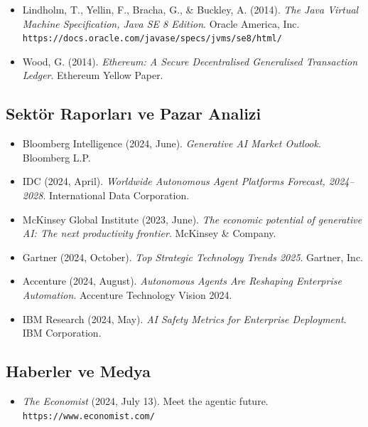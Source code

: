 \documentclass[11pt]{article}
\begin{document}
\begin{itemize}[noitemsep]
\begin{itemize}[noitemsep]
\begin{itemize}[noitemsep]
\begin{itemize}[noitemsep]
\begin{itemize}[noitemsep]
\begin{itemize}[noitemsep]
\begin{itemize}[noitemsep]
\begin{enumerate}[noitemsep]
\begin{itemize}[noitemsep]
\begin{itemize}[leftmargin=*, label={}]
  \item Lindholm, T., Yellin, F., Bracha, G., \& Buckley, A. (2014). \textit{The Java Virtual Machine Specification, Java SE 8 Edition}. Oracle America, Inc. \texttt{https://docs.oracle.com/javase/specs/jvms/se8/html/}

  \item Wood, G. (2014). \textit{Ethereum: A Secure Decentralised Generalised Transaction Ledger}. Ethereum Yellow Paper.
\end{itemize}

\subsection*{Sektör Raporları ve Pazar Analizi}

\begin{itemize}[leftmargin=*, label={}]
  \item Bloomberg Intelligence (2024, June). \textit{Generative AI Market Outlook}. Bloomberg L.P.

  \item IDC (2024, April). \textit{Worldwide Autonomous Agent Platforms Forecast, 2024--2028}. International Data Corporation.

  \item McKinsey Global Institute (2023, June). \textit{The economic potential of generative AI: The next productivity frontier}. McKinsey \& Company.

  \item Gartner (2024, October). \textit{Top Strategic Technology Trends 2025}. Gartner, Inc.

  \item Accenture (2024, August). \textit{Autonomous Agents Are Reshaping Enterprise Automation}. Accenture Technology Vision 2024.

  \item IBM Research (2024, May). \textit{AI Safety Metrics for Enterprise Deployment}. IBM Corporation.
\end{itemize}

\subsection*{Haberler ve Medya}

\begin{itemize}[leftmargin=*, label={}]
  \item \textit{The Economist} (2024, July 13). Meet the agentic future. \texttt{https://www.economist.com/}


\end{itemize}
\end{itemize}
\end{enumerate}
\end{itemize}
\end{itemize}
\end{itemize}
\end{itemize}
\end{itemize}
\end{itemize}
\end{itemize}
\end{document}
